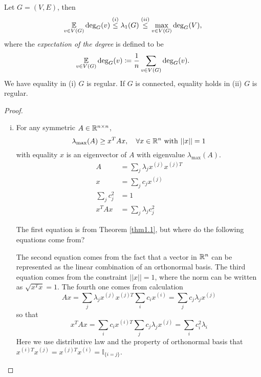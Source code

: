 \begin{proposition}
Let \(G=(V,E)\), then
\[ \operatorname*{\mathbb{E}}_{v\in V(G)} \deg_G(v) \stackrel{(i)}{\leq} \lambda_1(G) \stackrel{(ii)}{\leq} \max_{v\in V(G)}\deg_G(V), \]
where the \emph{expectation of the degree} is defined to be
\[ \operatorname*{\mathbb{E}}_{v\in V(G)} \deg_G(v)\coloneqq\frac{1}{n}\sum_{v\in V(G)}\deg_G(v). \]
We have equality in (i) \iff \(G\) is regular.
If \(G\) is connected, equality holds in (ii) \iff \(G\) is regular.
\end{proposition}
\begin{proof}
\begin{enumerate}[(i)]
\item For any symmetric \(A\in\mathbb{R}^{n\times n}\),
\[ \lambda_{\max}(A)\geq x^T Ax, \quad\forall x\in\mathbb{R}^n \text{ with } ||x||=1 \]
with equality \iff \(x\) is an eigenvector of \(A\) with eigenvalue \(\lambda_{\max}(A)\).
\begin{align*}
A&=\sum_j \lambda_j x^{(j)}x^{(j)T}\\
x&=\sum_j c_j x^{(j)}\\
\sum_j c_j^2&=1\\
x^T Ax&=\sum_j \lambda_j c_j^2
\end{align*}

\begin{question}
The first equation is from Theorem \ref{thm1.1}, but where do the following equations come from?
\end{question}
\begin{answer}
The second equation comes from the fact that a vector in \(\mathbb{R}^n\) can be represented as the linear combination of an orthonormal basis.
The third equation comes from the constraint \(||x||=1\), where the norm can be written as \(\sqrt{x^T x}=1\).
The fourth one comes from calculation
\[ Ax=\sum_j \lambda_j x^{(j)}x^{(j)T} \sum_i c_i x^{(i)}=\sum_j c_j\lambda_j x^{(j)} \]
so that
\[ x^T Ax=\sum_i c_i x^{(i)T}\sum_j c_j\lambda_j x^{(j)}=\sum_i c_i^2\lambda_i  \]
Here we use distributive law and the property of orthonormal basis that \(x^{(i)T}x^{(j)}=x^{(j)T}x^{(i)}=\mathbb{I}_{\{i=j\}}\).
\end{answer}




\end{enumerate}
\end{proof}
